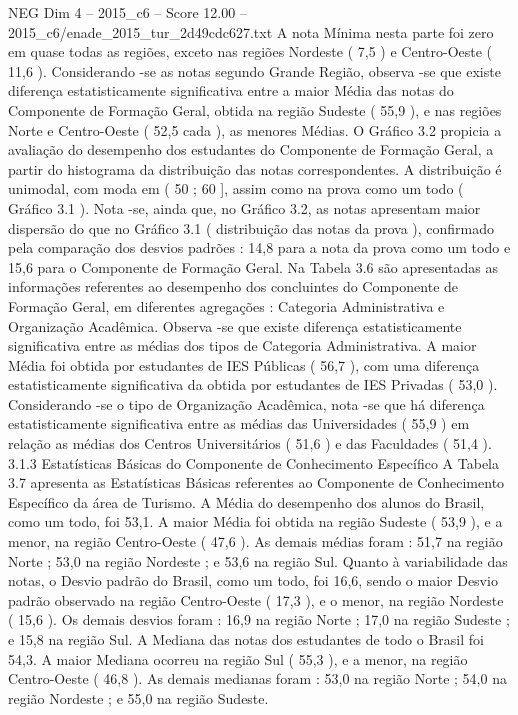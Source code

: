 \begin{textsample}{NEG Dim 4 – 2015\_c6 – Score 12.00 – 2015\_c6/enade\_2015\_tur\_2d49cdc627.txt}
A nota Mínima nesta parte foi zero em quase todas as regiões, exceto nas regiões Nordeste ( 7,5 ) e Centro-Oeste ( 11,6 ).
Considerando -se as notas segundo Grande Região, observa -se que existe diferença estatisticamente significativa entre a maior Média das notas do Componente de Formação Geral, obtida na região Sudeste ( 55,9 ), e nas regiões Norte e Centro-Oeste ( 52,5 cada ), as menores Médias.
O Gráfico 3.2 propicia a avaliação do desempenho dos estudantes do Componente de Formação Geral, a partir do histograma da distribuição das notas correspondentes.
A distribuição é unimodal, com moda em ( 50 ; 60 ], assim como na prova como um todo ( Gráfico 3.1 ).
Nota -se, ainda que, no Gráfico 3.2, as notas apresentam maior dispersão do que no Gráfico 3.1 ( distribuição das notas da prova ), confirmado pela comparação dos desvios padrões : 14,8 para a nota da prova como um todo e 15,6 para o Componente de Formação Geral.
Na Tabela 3.6 são apresentadas as informações referentes ao desempenho dos concluintes do Componente de Formação Geral, em diferentes agregações : Categoria Administrativa e Organização Acadêmica.
Observa -se que existe diferença estatisticamente significativa entre as médias dos tipos de Categoria Administrativa.
A maior Média foi obtida por estudantes de IES Públicas ( 56,7 ), com uma diferença estatisticamente significativa da obtida por estudantes de IES Privadas ( 53,0 ).
Considerando -se o tipo de Organização Acadêmica, nota -se que há diferença estatisticamente significativa entre as médias das Universidades ( 55,9 ) em relação as médias dos Centros Universitários ( 51,6 ) e das Faculdades ( 51,4 ). 3.1.3 Estatísticas Básicas do Componente de Conhecimento Específico A Tabela 3.7 apresenta as Estatísticas Básicas referentes ao Componente de Conhecimento Específico da área de Turismo.
A Média do desempenho dos alunos do Brasil, como um todo, foi 53,1.
A maior Média foi obtida na região Sudeste ( 53,9 ), e a menor, na região Centro-Oeste ( 47,6 ).
As demais médias foram : 51,7 na região Norte ; 53,0 na região Nordeste ; e 53,6 na região Sul.
Quanto à variabilidade das notas, o Desvio padrão do Brasil, como um todo, foi 16,6, sendo o maior Desvio padrão observado na região Centro-Oeste ( 17,3 ), e o menor, na região Nordeste ( 15,6 ).
Os demais desvios foram : 16,9 na região Norte ; 17,0 na região Sudeste ; e 15,8 na região Sul.
A Mediana das notas dos estudantes de todo o Brasil foi 54,3.
A maior Mediana ocorreu na região Sul ( 55,3 ), e a menor, na região Centro-Oeste ( 46,8 ).
As demais medianas foram : 53,0 na região Norte ; 54,0 na região Nordeste ; e 55,0 na região Sudeste.

\end{textsample}
